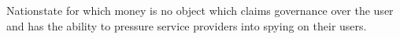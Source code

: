 Nationstate for which money is no object which claims governance over the user
and has the ability to pressure service providers into spying on their users.
